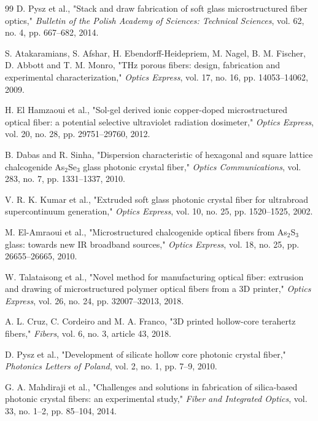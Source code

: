 \documentclass[5p,times,twocolumn]{elsarticle}
\begin{document}
\begin{thebibliography}{99}
 D. Pysz et al., "Stack and draw fabrication of soft glass microstructured fiber optics," \textit{Bulletin of the Polish Academy of Sciences: Technical Sciences}, vol. 62, no. 4, pp. 667--682, 2014.

 S. Atakaramians, S. Afshar, H. Ebendorff-Heidepriem, M. Nagel, B. M. Fischer, D. Abbott and T. M. Monro, "THz porous fibers: design, fabrication and experimental characterization," \textit{Optics Express}, vol. 17, no. 16, pp. 14053--14062, 2009.

 H. El Hamzaoui et al., "Sol-gel derived ionic copper-doped microstructured optical fiber: a potential selective ultraviolet radiation dosimeter," \textit{Optics Express}, vol. 20, no. 28, pp. 29751--29760, 2012.

 B. Dabas and R. Sinha, "Dispersion characteristic of hexagonal and square lattice chalcogenide As$_2$Se$_3$ glass photonic crystal fiber," \textit{Optics Communications}, vol. 283, no. 7, pp. 1331--1337, 2010.

 V. R. K. Kumar et al., "Extruded soft glass photonic crystal fiber for ultrabroad supercontinuum generation," \textit{Optics Express}, vol. 10, no. 25, pp. 1520--1525, 2002.

 M. El-Amraoui et al., "Microstructured chalcogenide optical fibers from As$_2$S$_3$ glass: towards new IR broadband sources," \textit{Optics Express}, vol. 18, no. 25, pp. 26655--26665, 2010.

 W. Talataisong et al., "Novel method for manufacturing optical fiber: extrusion and drawing of microstructured polymer optical fibers from a 3D printer," \textit{Optics Express}, vol. 26, no. 24, pp. 32007--32013, 2018.

 A. L. Cruz, C. Cordeiro and M. A. Franco, "3D printed hollow-core terahertz fibers," \textit{Fibers}, vol. 6, no. 3, article 43, 2018.

 D. Pysz et al., "Development of silicate hollow core photonic crystal fiber," \textit{Photonics Letters of Poland}, vol. 2, no. 1, pp. 7--9, 2010.

 G. A. Mahdiraji et al., "Challenges and solutions in fabrication of silica-based photonic crystal fibers: an experimental study," \textit{Fiber and Integrated Optics}, vol. 33, no. 1--2, pp. 85--104, 2014.


\end{thebibliography}
\end{document}
